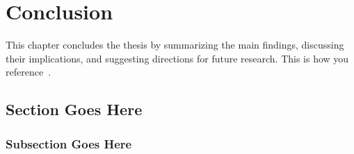 \chapter{Conclusion}
\label{chap:conclusion}

This chapter concludes the thesis by summarizing the main findings, discussing
their implications, and suggesting directions for future research. This is how
you reference~\cite{greenwade93}.


\section{Section Goes Here}
\subsection{Subsection Goes Here}

